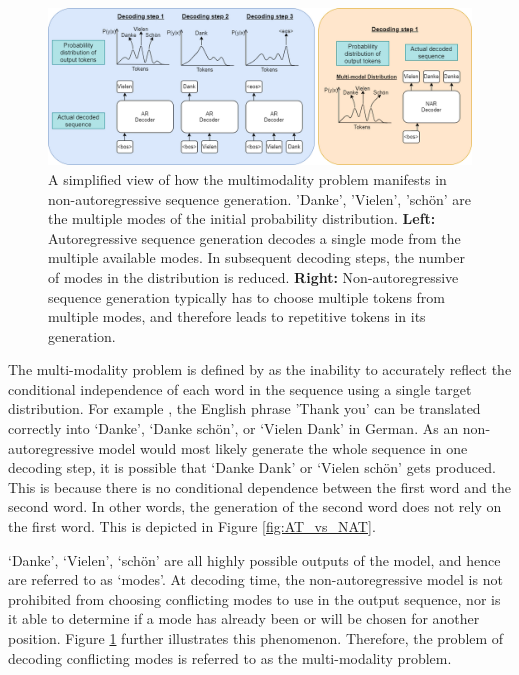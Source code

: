\begin{figure}[hpbt!]

    \centering
    \includegraphics[width=\textwidth]{images/chap02_images/AT_vs_NAT_distributions.png}
    \caption{A simplified view of how the multimodality problem manifests in non-autoregressive sequence generation. 'Danke', 'Vielen', 'schön' are the multiple modes of the  initial probability distribution. \textbf{Left:} Autoregressive sequence generation decodes a single mode from the multiple available modes. In subsequent decoding steps, the number of modes in the distribution is reduced. \textbf{Right:} Non-autoregressive sequence generation typically has to choose multiple tokens from multiple modes, and therefore leads to repetitive tokens in its generation.}
    \label{fig:AT_vs_NAT_distribution}
\end{figure}
%   


The multi-modality problem is defined by \textcite{gu_non-autoregressive_2018} as the inability to accurately reflect the conditional independence of each word in the sequence using a single target distribution. For example \cite{gu_non-autoregressive_2018}, the English phrase 'Thank you' can be translated correctly into `Danke', `Danke schön', or `Vielen Dank' in German. As an non-autoregressive model would most likely generate the whole sequence in one decoding step, it is possible that `Danke Dank' or `Vielen schön' gets produced. This is because there is no conditional dependence between the first word and the second word. In other words, the generation of the second word does not rely on the first word. This is depicted in Figure \ref{fig:AT_vs_NAT}. 

`Danke', `Vielen', `schön' are all highly possible outputs of the model, and hence are referred to as `modes'. At decoding time, the non-autoregressive model is not prohibited from choosing conflicting modes to use in the output sequence, nor is it able to determine if a mode has already been or will be chosen for another position. Figure \ref{fig:AT_vs_NAT_distribution} further illustrates this phenomenon. Therefore, the problem of decoding conflicting modes is referred to as the multi-modality problem.

